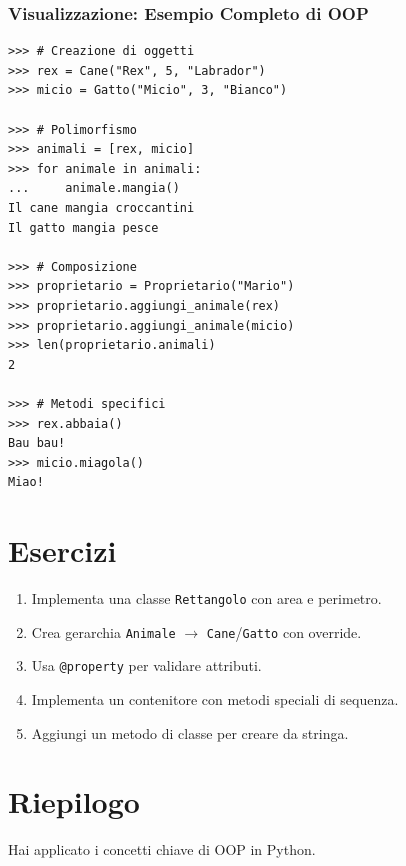 \subsubsection{Visualizzazione: Esempio Completo di OOP}
\begin{tcolorbox}[title=Output Terminale, colback=black!5, colframe=gray!50]
\begin{lstlisting}[style=python]
>>> # Creazione di oggetti
>>> rex = Cane("Rex", 5, "Labrador")
>>> micio = Gatto("Micio", 3, "Bianco")

>>> # Polimorfismo
>>> animali = [rex, micio]
>>> for animale in animali:
...     animale.mangia()
Il cane mangia croccantini
Il gatto mangia pesce

>>> # Composizione
>>> proprietario = Proprietario("Mario")
>>> proprietario.aggiungi_animale(rex)
>>> proprietario.aggiungi_animale(micio)
>>> len(proprietario.animali)
2

>>> # Metodi specifici
>>> rex.abbaia()
Bau bau!
>>> micio.miagola()
Miao!
\end{lstlisting}
\end{tcolorbox}

\section{Esercizi}
\begin{enumerate}
  \item Implementa una classe \texttt{Rettangolo} con area e perimetro.
  \item Crea gerarchia \texttt{Animale} $\rightarrow$ \texttt{Cane}/\texttt{Gatto} con override.
  \item Usa \texttt{@property} per validare attributi.
  \item Implementa un contenitore con metodi speciali di sequenza.
  \item Aggiungi un metodo di classe per creare da stringa.
\end{enumerate}

\section{Riepilogo}
Hai applicato i concetti chiave di OOP in Python.

